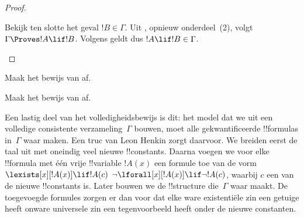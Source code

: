 \documentclass[openany]{memoir}
\begin{document}
\begin{proof}
\begin{enumerate}
{{Bekijk ten slotte het geval $!B \in \Gamma$. Uit
,
opnieuw onderdeel~(2), volgt $\Gamma \Proves !A \lif !B$. Volgens
 geldt dus $!A \lif !B \in \Gamma$.}}
\end{enumerate}
\end{proof}

\begin{prob}
Maak het bewijs van  af.
\end{prob}
\tagendprob

\begin{prob}
Maak het bewijs van  af.
\end{prob}
\tagendprob
\endgroup

\begingroup
\def\olfilename{OLP-0130}
\def\olfilepath{content/first-order-logic/completeness/}
\hypertarget{unit-OLP-0130}{}





\begin{explain}
Een lastig deel van het volledigheidsbewijs is dit: het model dat we uit
een volledige consistente verzameling~$\Gamma$ bouwen, moet alle
gekwantificeerde !!{formula}s in~$\Gamma$ waar maken. Een truc van Leon
Henkin zorgt daarvoor. We breiden eerst de taal uit met oneindig veel
nieuwe !!{constant}s. Daarna voegen we voor elke !!{formula} met één
vrije !!{variable} $!A(x)$ een formule toe van de vorm
      {$\lexists[x][!A(x)] \lif !A(c)$}
      {$\lnot\lforall[x][!A(x)] \lif \lnot !A(c)$},
waarbij $c$ een van de nieuwe !!{constant}s is. Later bouwen we de
!!{structure} die~$\Gamma$ waar maakt. De toegevoegde formules zorgen er
dan voor dat elke
{ware existentiële zin een getuige heeft}
{onware universele zin een tegenvoorbeeld heeft}
onder de nieuwe constanten.
\end{explain}
\end{document}
